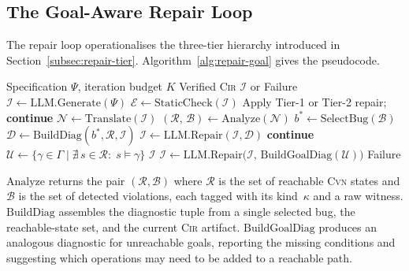 \documentclass[sigconf]{acmart}
\begin{document}
\subsection{The Goal-Aware Repair Loop}
\label{subsec:repair-loop-final}
The repair loop operationalises the three-tier hierarchy introduced in Section~\ref{subsec:repair-tier}.
Algorithm~\ref{alg:repair-goal} gives the pseudocode.

\begin{algorithm}[t]
\caption{Goal-Aware Generate--Verify--Repair Loop}
\label{alg:repair-goal}
\begin{algorithmic}[1]
\Require Specification $\Psi$, iteration budget $K$
\Ensure  Verified \textsc{Cir} $\mathcal{I}$ or Failure
\State $\mathcal{I} \gets \text{LLM.Generate}(\Psi)$
    \State $\mathcal{E} \gets \text{StaticCheck}(\mathcal{I})$
        \State Apply Tier-1 or Tier-2 repair;\;
          \textbf{continue}
    \EndIf
    \State $\mathcal{N} \gets \text{Translate}(\mathcal{I})$
    \State $(\mathcal{R},\,\mathcal{B})
      \gets \text{Analyze}(\mathcal{N})$
        \State $b^{*} \gets \text{SelectBug}(\mathcal{B})$
        \State $\mathcal{D} \gets
          \text{BuildDiag}(b^{*},\mathcal{R},\mathcal{I})$
        \State $\mathcal{I} \gets
          \text{LLM.Repair}(\mathcal{I},\mathcal{D})$
        \State \textbf{continue}
    \EndIf
    \State $\mathcal{U} \gets
      \{\gamma\in\Gamma \mid
        \nexists\,s\in\mathcal{R}:\;s\models\gamma\}$
        \Return $\mathcal{I}$
    \EndIf
    \State $\mathcal{I} \gets
      \text{LLM.Repair}\bigl(\mathcal{I},\,
        \text{BuildGoalDiag}(\mathcal{U})\bigr)$
\EndFor
\State \Return Failure
\end{algorithmic}
\end{algorithm}

$\text{Analyze}$ returns the pair $(\mathcal{R},\mathcal{B})$ where $\mathcal{R}$ is the set of reachable \textsc{Cvn} states and $\mathcal{B}$ is the set of detected violations, each tagged with its kind~$\kappa$ and a raw witness. $\text{BuildDiag}$ assembles the diagnostic tuple from a single selected bug, the reachable-state set, and the current \textsc{Cir} artifact. $\text{BuildGoalDiag}$ produces an analogous diagnostic for unreachable goals, reporting the missing conditions and suggesting which operations may need to be added to a reachable path.
\end{document}
